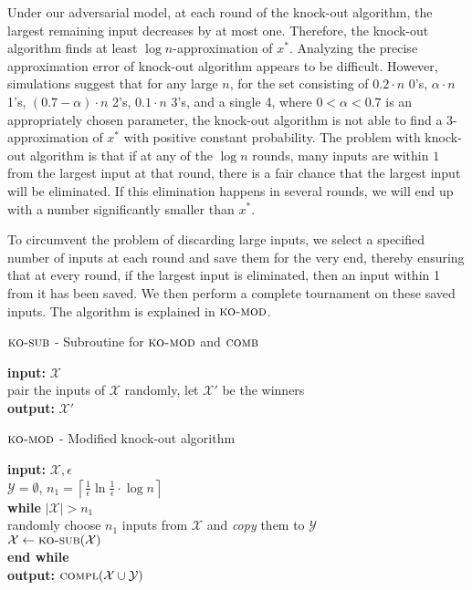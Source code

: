 \documentclass[twoside,11pt]{article}
\newcommand{\cY}{\mathcal{Y}}
\newcommand{\cX}{\mathcal{X}}
\newcommand{\algorithms}[1]{\textsc{#1}}
\newcommand{\algcomp}{\algorithms{compl}}
\newcommand{\algkosub}{\algorithms{ko-sub}}
\newcommand{\algkomod}{\algorithms{ko-mod}}
\newcommand{\algcomb}{\algorithms{comb}}
\newcommand{\maxx}{x^*}
\newcommand{\errorcomb}{\epsilon}
\begin{document}
Under our adversarial model, at each round of the knock-out
algorithm, the largest remaining input decreases by at most one.
Therefore, the knock-out algorithm finds at least $\log n$-approximation
of $\maxx$.  Analyzing the precise approximation error of knock-out
algorithm appears to be difficult. However,
  simulations suggest that for any large $n$, for the set consisting
  of $0.2\cdot n$ 0's, $\alpha\cdot n$ 1's, $(0.7-\alpha)\cdot n$ 2's,
  $0.1\cdot n$ 3's, and a single 4, where $0<\alpha<0.7$ is an
  appropriately chosen parameter, the knock-out algorithm is not able
  to find a $3$-approximation of $\maxx$ with positive constant
  probability. The problem with knock-out algorithm is that
  if at any of the $\log n$ rounds, many inputs are within $1$ from
  the largest input at that round, there is a fair chance that the
  largest input will be eliminated. If this elimination happens in
  several rounds, we will end up with a number significantly
  smaller than $\maxx$.

To circumvent the problem of discarding large inputs, we select a specified number of inputs at each round and save them for the very end, thereby ensuring that at every round, if the largest input is eliminated, then an input within 1 from it has been saved.
We then perform a complete tournament on these saved inputs.
The algorithm is explained in $\algkomod$.

\begin{algorithm}
\caption{$\algkosub$ - Subroutine for $\algkomod$ and $\algcomb$}
\textbf{input:} $\cX$\\
\qquad pair the inputs of $\cX$ randomly, let $\cX'$ be the winners\\
\textbf{output:} $\cX'$ 
\end{algorithm}

\begin{algorithm}
\caption{$\algkomod$ - Modified knock-out algorithm}
\textbf{input:} $\cX,\errorcomb$\\
\qquad $\cY=\emptyset$, $n_1 =\left\lceil\frac1\errorcomb\ln \frac1\errorcomb \cdot\log n \right\rceil$\\
\qquad \textbf{while} $|\cX|>n_1$\\
\qquad\qquad  randomly choose $n_1$ inputs from $\cX$ and \emph{copy} them to $\cY$\\
\qquad\qquad  $\cX\leftarrow\algkosub(\cX)$\\
\qquad \textbf{end while} \\
\textbf{output:} $\algcomp(\cX \cup \cY)$
\end{algorithm}
\end{document}
